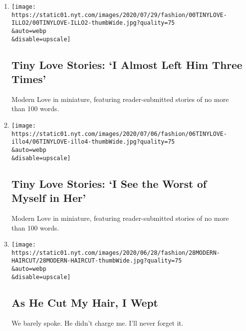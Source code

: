 \begin{enumerate}
\def\labelenumi{\arabic{enumi}.}
\item
  \href{/2020/08/04/style/tiny-modern-love-stories-coronavirus-i-almost-left-him.html}{}

  \texttt{[image: https://static01.nyt.com/images/2020/07/29/fashion/00TINYLOVE-ILLO2/00TINYLOVE-ILLO2-thumbWide.jpg?quality=75\\\&auto=webp\\\&disable=upscale]}

  \hypertarget{tiny-love-stories-i-almost-left-him-three-times}{%
  \subsection{Tiny Love Stories: `I Almost Left Him Three
  Times'}\label{tiny-love-stories-i-almost-left-him-three-times}}

  Modern Love in miniature, featuring reader-submitted stories of no
  more than 100 words.
\item
  \href{/2020/06/30/style/tiny-modern-love-stories-coronavirus-i-see-the-worst-of-myself-in-her.html}{}

  \texttt{[image: https://static01.nyt.com/images/2020/07/06/fashion/06TINYLOVE-illo4/06TINYLOVE-illo4-thumbWide.jpg?quality=75\\\&auto=webp\\\&disable=upscale]}

  \hypertarget{tiny-love-stories-i-see-the-worst-of-myself-in-her}{%
  \subsection{Tiny Love Stories: `I See the Worst of Myself in
  Her'}\label{tiny-love-stories-i-see-the-worst-of-myself-in-her}}

  Modern Love in miniature, featuring reader-submitted stories of no
  more than 100 words.
\item
  \href{/2020/06/26/style/modern-love-coronavirus-as-he-cut-my-hair-i-wept.html}{}

  \texttt{[image: https://static01.nyt.com/images/2020/06/28/fashion/28MODERN-HAIRCUT/28MODERN-HAIRCUT-thumbWide.jpg?quality=75\\\&auto=webp\\\&disable=upscale]}

  \hypertarget{as-he-cut-my-hair-i-wept}{%
  \subsection{As He Cut My Hair, I
  Wept}\label{as-he-cut-my-hair-i-wept}}

  We barely spoke. He didn't charge me. I'll never forget it.


\end{enumerate}
